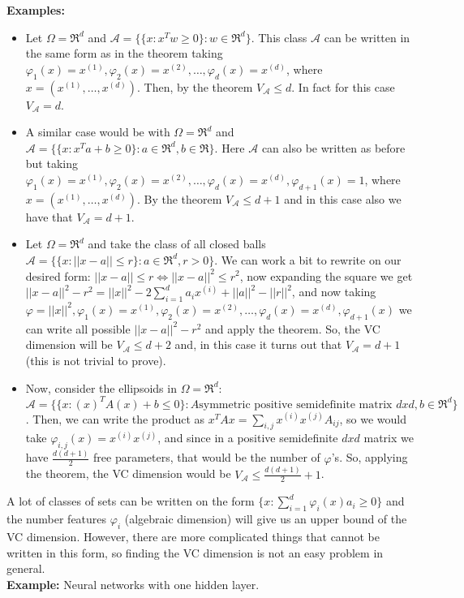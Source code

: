 \documentclass[11pt, english]{article}
\newcommand{\su}[2]{\sum\limits_{#1}^{#2}}
\begin{document}
\textbf{Examples:}
\begin{itemize}
	\item Let $\Omega=\Re^d$ and $\mathcal{A}=\{\{x:x^Tw\geq 0\}:w\in\Re^d\}$. This class $\mathcal{A}$ can be written in the same form as in the theorem taking $\varphi_1(x)=x^{(1)},\varphi_2(x)=x^{(2)},\dots,\varphi_d(x)=x^{(d)}$, where $x=(x^{(1)},\dots,x^{(d)})$. Then, by the theorem $V_{\mathcal{A}}\leq d$. In fact for this case $V_{\mathcal{A}}=d$.
	\item A similar case would be with $\Omega=\Re^d$ and $\mathcal{A}=\{\{x:x^Ta+b\geq 0\}:a\in\Re^d,b\in\Re\}$. Here $\mathcal{A}$ can also be written as before but taking $\varphi_1(x)=x^{(1)},\varphi_2(x)=x^{(2)},\dots,\varphi_d(x)=x^{(d)},\varphi_{d+1}(x)=1$, where $x=(x^{(1)},\dots,x^{(d)})$. By the theorem $V_{\mathcal{A}}\leq d+1$ and in this case also we have that $V_{\mathcal{A}}=d+1$.
	\item Let $\Omega=\Re^d$ and take the class of all closed balls $\mathcal{A}=\{\{x:||x-a||\leq r\}:a\in\Re^d,r>0 \}$. We can work a bit to rewrite on our desired form: $||x-a||\leq r\Leftrightarrow ||x-a||^2\leq r^2$, now expanding the square we get $||x-a||^2-r^2=||x||^2-2\su{i=1}{d}a_ix^{(i)}+||a||^2-||r||^2$, and now taking $\varphi=||x||^2,\varphi_1(x)=x^{(1)},\varphi_2(x)=x^{(2)},\dots,\varphi_d(x)=x^{(d)},\varphi_{d+1}(x)$ we can write all possible $||x-a||^2-r^2$ and apply the theorem. So, the VC dimension will be $V_{\mathcal{A}}\leq d+2$ and, in this case it turns out that $V_{\mathcal{A}}=d+1$ (this is not trivial to prove).
	\item Now, consider the ellipsoids in $\Omega=\Re^d$: $\mathcal{A}=\{\{x:(x)^TA(x)+b\leq 0\}:A\text{symmetric positive semidefinite matrix } dxd,b\in\Re^d\}$. Then, we can write the product as $x^TAx=\su{i,j}{}x^{(i)}x^{(j)}A_{ij}$, so we would take $\varphi_{i,j}(x)=x^{(i)}x^{(j)}$, and since in a positive semidefinite $dxd$ matrix we have $\frac{d(d+1)}{2}$ free parameters, that would be the number of $\varphi$'s. So, applying the theorem, the VC dimension would be $V_{\mathcal{A}}\leq\frac{d(d+1)}{2}+1$.

\end{itemize}
A lot of classes of sets can be written on the form $\{x:\su{i=1}{d}\varphi_i(x)a_i\geq 0\}$ and the number features $\varphi_i$ (algebraic dimension) will give us an upper bound of the VC dimension. However, there are more complicated things that cannot be written in this form, so finding the VC dimension is not an easy problem in general.\\

\textbf{Example:} Neural networks with one hidden layer. 
\end{document}

